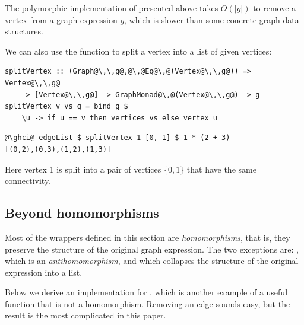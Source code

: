The polymorphic implementation of  presented above takes
$O(|g|)$ to remove a vertex from a graph expression $g$, which is
slower than some concrete graph data structures.

We can also use the  function to split a vertex into a list of given vertices:

\begin{verbatim}
splitVertex :: (Graph@\,\,g@,@\,@Eq@\,@(Vertex@\,\,g@)) => Vertex@\,\,g@
    -> [Vertex@\,\,g@] -> GraphMonad@\,@(Vertex@\,\,g@) -> g
splitVertex v vs g = bind g $
    \u -> if u == v then vertices vs else vertex u
\end{verbatim}
\vspace{1mm}
\begin{verbatim}
@\ghci@ edgeList $ splitVertex 1 [0, 1] $ 1 * (2 + 3)
[(0,2),(0,3),(1,2),(1,3)]
\end{verbatim}

\noindent
Here vertex 1 is split into a pair of vertices $\{0, 1\}$ that have the same connectivity.

\subsection{Beyond homomorphisms}\label{sub-beyond}

Most of the  wrappers defined in this section are \emph{homomorphisms},
that is, they preserve the structure of the original graph expression. The two
exceptions are: , which is an \emph{antihomomorphism}, and
 which collapses the structure of the original expression into a list.

Below we derive an implementation for , which is another
example of a useful function that is not a homomorphism. Removing an edge sounds
easy, but the result is the most complicated  in this paper.

